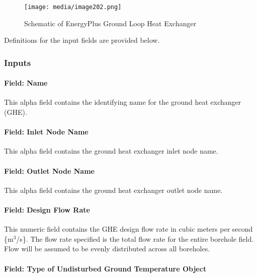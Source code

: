 \begin{figure}[hbtp] %
\centering
\texttt{[image: media/image202.png]}
\caption{Schematic of EnergyPlus Ground Loop Heat Exchanger \protect \label{fig:schematic-of-energyplus-ground-loop-heat}}
\end{figure}

Definitions for the input fields are provided below.

\subsubsection{Inputs}\label{inputs-10-002}

\paragraph{Field: Name}\label{field-name-9-003}

This alpha field contains the identifying name for the ground heat exchanger (GHE).

\paragraph{Field: Inlet Node Name}\label{field-inlet-node-name-000}

This alpha field contains the ground heat exchanger inlet node name.

\paragraph{Field: Outlet Node Name}\label{field-outlet-node-name-001}

This alpha field contains the ground heat exchanger outlet node name.

\paragraph{Field: Design Flow Rate}\label{field-design-flow-rate-000}

This numeric field contains the GHE design flow rate in cubic meters per second \{m\(^{3}\)/s\}. The flow rate specified is the total flow rate for the entire borehole field. Flow will be assumed to be evenly distributed across all boreholes.

\paragraph{Field: Type of Undisturbed Ground Temperature Object}\label{field-type-of-undisturbed-ground-temperature-object}

